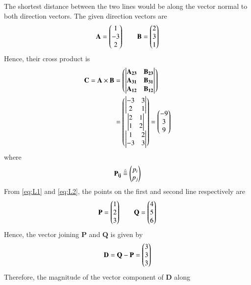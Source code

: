 \documentclass[journal,12pt,twocolumn]{IEEEtran}
\let\vec\mathbf
\begin{document}
\begin{enumerate}
    \solution The shortest distance between the two lines would be along the 
    vector normal to both direction vectors. The given direction vectors are
    \begin{align}
        \vec{A} = \myvec{1\\-3\\2} \qquad \vec{B} = \myvec{2\\3\\1}
        \label{eq:dir-vec}
    \end{align}
    Hence, their cross product is
    \begin{align}
        \vec{C} = \vec{A}\times\vec{B} &= \myvec{\mydet{\vec{A_{23}}&\vec{B_{23}}}\\
                                                \mydet{\vec{A_{31}}&\vec{B_{31}}}\\
                                                \mydet{\vec{A_{12}}&\vec{B_{12}}}
                                                } \\
        &= \myvec{\mydet{-3&3\\2&1}\\\mydet{2&1\\1&2}\\\mydet{1&2\\-3&3}} = \myvec{-9\\3\\9}                
        \label{eq:cross-prod}
    \end{align}
    where
    \begin{align}
        \vec{P_{ij}} \define \myvec{p_i\\p_j}
        \label{eq:def-Aij}
    \end{align}
    From \eqref{eq:L1} and \eqref{eq:L2}, the points on the first and second 
    line respectively are
    \begin{align}
        \vec{P} = \myvec{1\\2\\3} \qquad \vec{Q} = \myvec{4\\5\\6}
        \label{eq:pts}
    \end{align}
    Hence, the vector joining $\vec{P}$ and $\vec{Q}$ is given by
    \begin{align}
        \vec{D} = \vec{Q} - \vec{P} = \myvec{3\\3\\3}
    \end{align}
    Therefore, the magnitude of the vector component of $\vec{D}$ along 

\end{enumerate}
\end{document}
